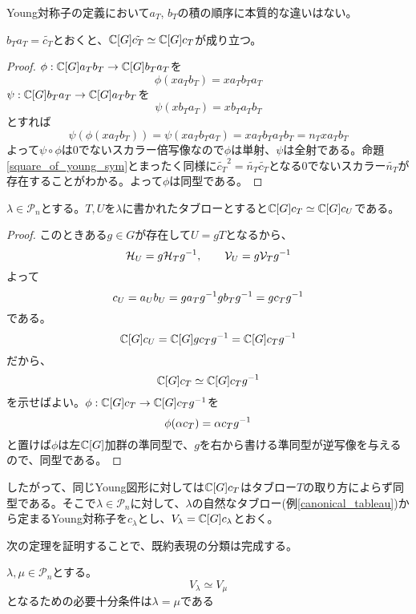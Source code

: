 \documentclass{ltjsreport}
\begin{document}
Young対称子の定義において$a_T$, $b_T$の積の順序に本質的な違いはない。

\begin{prop}\label{reverse_young_sym}
  $b_T a_T=\tilde{c_T}$とおくと、$\mathbb{C}[G]\tilde{c_T}\simeq \mathbb{C}[G]c_T$が成り立つ。
\end{prop}

\begin{proof}
  $\phi:\mathbb{C}[G]a_Tb_T\rightarrow\mathbb{C}[G]b_Ta_T$を
  \[
  \phi(xa_Tb_T)=xa_Tb_Ta_T  
  \]
  $\psi:\mathbb{C}[G]b_Ta_T\rightarrow\mathbb{C}[G]a_Tb_T$を
  \[
  \psi(xb_Ta_T)=xb_Ta_Tb_T  
  \]
  とすれば
  \[
  \psi(\phi(xa_Tb_T))=\psi(xa_Tb_Ta_T)=xa_Tb_Ta_Tb_T=n_Txa_Tb_T  
  \]
  よって$\psi\circ\phi$は0でないスカラー倍写像なので$\phi$は単射、$\psi$は全射である。命題\ref{square_of_young_sym}とまったく同様に$\tilde{c_T}^2=\tilde{n_T}\tilde{c_T}$となる0でないスカラー$\tilde{n_T}$が存在することがわかる。よって$\phi$は同型である。
\end{proof}


\begin{prop}
  $\lambda\in\mathcal{P}_n$とする。$T,U$を$\lambda$に書かれたタブローとすると$\mathbb{C}[G]c_T\simeq \mathbb{C}[G]c_U$である。
\end{prop}

\begin{proof}
  このときある$g\in G$が存在して$U=gT$となるから、
  \[
  \mathcal{H}_U=g\mathcal{H}_Tg^{-1},\qquad \mathcal{V}_U=g\mathcal{V}_Tg^{-1}  
  \]
  よって
  \[
  c_U=a_Ub_U=ga_Tg^{-1}gb_Tg^{-1}=gc_Tg^{-1}  
  \]
  である。
  \[
  \mathbb{C}[G]c_U=\mathbb{C}[G]gc_Tg^{-1}=\mathbb{C}[G]c_Tg^{-1}  
  \]
  だから、
  \[
  \mathbb{C}[G]c_T\simeq \mathbb{C}[G]c_Tg^{-1}  
  \]
  を示せばよい。$\phi:\mathbb{C}[G]c_T\rightarrow\mathbb{C}[G]c_Tg^{-1}$を
  \[
  \phi(\alpha c_T)=\alpha c_Tg^{-1}  
  \]
  と置けば$\phi$は左$\mathbb{C}[G]$加群の準同型で、$g$を右から書ける準同型が逆写像を与えるので、同型である。
\end{proof}


したがって、同じYoung図形に対しては$\mathbb{C}[G]c_T$はタブロー$T$の取り方によらず同型である。そこで$\lambda\in\mathcal{P}_n$に対して、$\lambda$の自然なタブロー(例\ref{canonical_tableau})から定まるYoung対称子を$c_\lambda$とし、$V_\lambda=\mathbb{C}[G]c_\lambda$とおく。





次の定理を証明することで、既約表現の分類は完成する。

\begin{theo}\label{young_and_irr_rep}
  $\lambda,\mu\in\mathcal{P}_n$とする。
  \[
  V_\lambda\simeq V_\mu 
  \]
  となるための必要十分条件は$\lambda=\mu$である
\end{theo}
\end{document}
